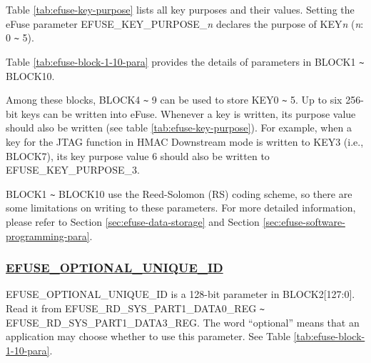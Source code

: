 \documentclass[main\_\_EN.tex]{subfiles}
\begin{document}
\clearpage
\begin{landscape}



\end{landscape}
\restoregeometry
\clearpage


Table \ref{tab:efuse-key-purpose} lists all key purposes and their values. Setting the eFuse parameter EFUSE\_KEY\_PURPOSE\_\textcolor{myred}{\it{n}} declares the purpose of KEY\textcolor{myred}{\it{n}} (\textcolor{myred}{\it{n}}: 0 \verb+~+ 5).



Table  \ref{tab:efuse-block-1-10-para} provides the details of parameters in BLOCK1 \verb+~+ BLOCK10.

\clearpage
\begin{landscape}



\end{landscape}
\restoregeometry
\clearpage



Among these blocks, BLOCK4 \verb+~+ 9 can be used to store KEY0 \verb+~+ 5. Up to six 256-bit keys can be written into eFuse. Whenever a key is written, its purpose value should also be written (see table \ref{tab:efuse-key-purpose}). For example, when a key for the JTAG function in HMAC Downstream mode is written to KEY\textcolor{myred}{3} (i.e., BLOCK7), its key purpose value 6 should also be written to EFUSE\_KEY\_PURPOSE\_\textcolor{myred}{3}.


BLOCK1 \verb+~+ BLOCK10 use the Reed-Solomon (RS) coding scheme, so there are some limitations on writing to these parameters. For more detailed information, please refer to Section \ref{sec:efuse-data-storage} and Section \ref{sec:efuse-software-programming-para}.

\subsubsection{\texorpdfstring{\hyperref[fielddesc:EFUSEOPTIONALUNIQUEID]{EFUSE\_OPTIONAL\_UNIQUE\_ID}}{EFUSE\_OPTIONAL\_UNIQUE\_ID}}
\label{sec:efuse-optional-unique-id}

EFUSE\_OPTIONAL\_UNIQUE\_ID is a 128-bit parameter in BLOCK2[127:0]. Read it from EFUSE\_RD\_SYS\_PART1\_DATA0\_REG \verb+~+ EFUSE\_RD\_SYS\_PART1\_DATA3\_REG. The word ``optional'' means that an application may choose whether to use this parameter. See Table \ref{tab:efuse-block-1-10-para}.
\end{document}

